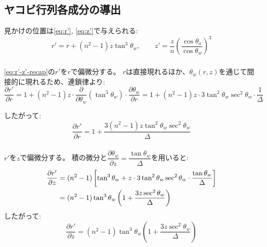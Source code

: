 \subsection{ヤコビ行列各成分の導出}

見かけの位置は\eqref{eq:r'}, \eqref{eq:z'}で与えられる:
\begin{equation}\label{eq:r'-z'-recap}
  r' = r + (n^2 - 1) z \tan^3 \theta_w, \qquad z' = \frac{z}{n} \left( \frac{\cos \theta_a}{\cos \theta_w} \right)^3
\end{equation}

\subsubsection{}

\eqref{eq:r'-z'-recap}の$r'$を$r$で偏微分する。
$r$は直接現れるほか、$\theta_w(r,z)$を通じて間接的に現れるため、連鎖律より:
\begin{equation}\label{eq:dr'-dr}
  \frac{\partial r'}{\partial r} = 1 + (n^2 - 1) z \cdot \frac{\partial}{\partial \theta_w}(\tan^3 \theta_w) \cdot \frac{\partial \theta_w}{\partial r} = 1 + (n^2 - 1) z \cdot 3 \tan^2 \theta_w \sec^2 \theta_w \cdot \frac{1}{\Delta}
\end{equation}

したがって:
\begin{equation}\label{eq:J11}
  \frac{\partial r'}{\partial r} = 1 + \frac{3(n^2 - 1) z \tan^2 \theta_w \sec^2 \theta_w}{\Delta}
\end{equation}


\subsubsection{}

$r'$を$z$で偏微分する。
積の微分と$\dfrac{\partial \theta_w}{\partial z} = \dfrac{\tan \theta_w}{\Delta}$を用いると:
\begin{align}
  \frac{\partial r'}{\partial z} &= (n^2 - 1) \left[ \tan^3 \theta_w + z \cdot 3 \tan^2 \theta_w \sec^2 \theta_w \cdot \frac{\tan \theta_w}{\Delta} \right] \notag \\
  &= (n^2 - 1) \tan^3 \theta_w \left( 1 + \frac{3 z \sec^2 \theta_w}{\Delta} \right)
\end{align}
したがって:
\begin{equation}\label{eq:J12}
  \frac{\partial r'}{\partial z} = (n^2 - 1) \tan^3 \theta_w \left( 1 + \frac{3 z \sec^2 \theta_w}{\Delta} \right)
\end{equation}


